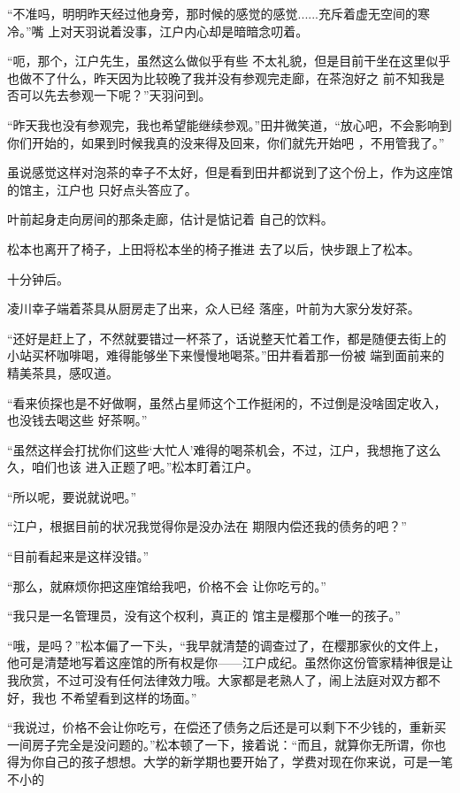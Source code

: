 \documentclass{article}
\begin{document}
“不准吗，明明昨天经过他身旁，那时候的感觉的感觉......充斥着虚无空间的寒冷。”嘴
上对天羽说着没事，江户内心却是暗暗念叨着。 

“呃，那个，江户先生，虽然这么做似乎有些
\newpage
不太礼貌，但是目前干坐在这里似乎也做不了什么，昨天因为比较晚了我并没有参观完走廊，在茶泡好之
前不知我是否可以先去参观一下呢？”天羽问到。 

“昨天我也没有参观完，我也希望能继续参观。”田井微笑道，“放心吧，不会影响到你们开始的，如果到时候我真的没来得及回来，你们就先开始吧
，不用管我了。” 

虽说感觉这样对泡茶的幸子不太好，但是看到田井都说到了这个份上，作为这座馆的馆主，江户也
只好点头答应了。 

叶前起身走向房间的那条走廊，估计是惦记着
自己的饮料。 

松本也离开了椅子，上田将松本坐的椅子推进
去了以后，快步跟上了松本。 


十分钟后。 

\newpage

凌川幸子端着茶具从厨房走了出来，众人已经
落座，叶前为大家分发好茶。 

“还好是赶上了，不然就要错过一杯茶了，话说整天忙着工作，都是随便去街上的小站买杯咖啡喝，难得能够坐下来慢慢地喝茶。”田井看着那一份被
端到面前来的精美茶具，感叹道。 

“看来侦探也是不好做啊，虽然占星师这个工作挺闲的，不过倒是没啥固定收入，也没钱去喝这些
好茶啊。” 

“虽然这样会打扰你们这些‘大忙人’难得的喝茶机会，不过，江户，我想拖了这么久，咱们也该
进入正题了吧。”松本盯着江户。 


“所以呢，要说就说吧。” 

“江户，根据目前的状况我觉得你是没办法在
期限内偿还我的债务的吧？” 

\newpage


“目前看起来是这样没错。” 

“那么，就麻烦你把这座馆给我吧，价格不会
让你吃亏的。” 

“我只是一名管理员，没有这个权利，真正的
馆主是樱那个唯一的孩子。” 

“哦，是吗？”松本偏了一下头，“我早就清楚的调查过了，在樱那家伙的文件上，他可是清楚地写着这座馆的所有权是你——江户成纪。虽然你这份管家精神很是让我欣赏，不过可没有任何法律效力哦。大家都是老熟人了，闹上法庭对双方都不好，我也
不希望看到这样的场面。” 

“我说过，价格不会让你吃亏，在偿还了债务之后还是可以剩下不少钱的，重新买一间房子完全是没问题的。”松本顿了一下，接着说：“而且，就算你无所谓，你也得为你自己的孩子想想。大学的新学期也要开始了，学费对现在你来说，可是一笔不小的
\end{document}
